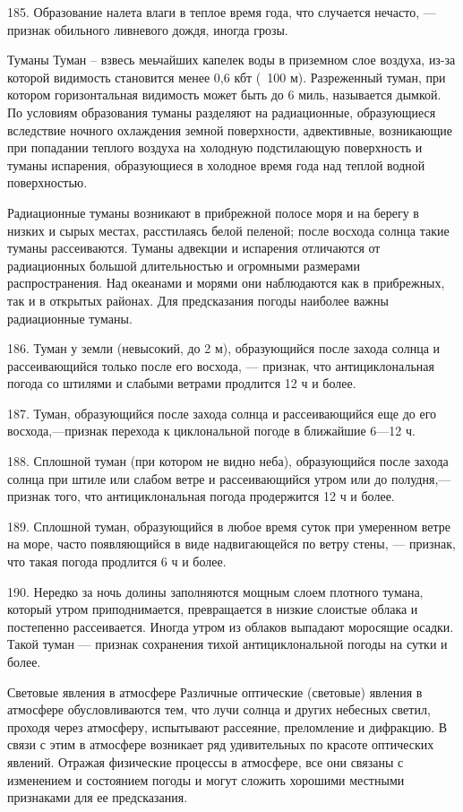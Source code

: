 185. Образование налета влаги в теплое время года, что случается нечасто, — признак обильного ливневого дождя, иногда грозы.

Туманы
Туман -- взвесь меьчайших капелек воды в приземном слое воздуха, из-за которой видимость становится менее 0,6 кбт (~100 м). Разреженный туман, при котором горизонтальная видимость может быть до 6 миль, называется дымкой. По условиям образования туманы разделяют на радиационные, образующиеся вследствие ночного охлаждения земной поверхности, адвективные, возникающие при попадании теплого воздуха на холодную подстилающую поверхность и туманы испарения, образующиеся в холодное время года над теплой водной поверхностью.

Радиационные туманы возникают в прибрежной полосе моря и на берегу в низких и сырых местах, расстилаясь белой пеленой; после восхода солнца такие туманы рассеиваются. Туманы адвекции и испарения отличаются от радиационных большой длительностью и огромными размерами распространения. Над океанами и морями они наблюдаются как в прибрежных, так и в открытых районах. Для предсказания погоды наиболее важны радиационные туманы.

186. Туман у земли (невысокий, до 2 м), образующийся после захода солнца и рассеивающийся только после его восхода, — признак, что антициклональная погода со штилями и слабыми ветрами продлится 12 ч и более.

187. Туман, образующийся после захода солнца и рассеивающийся еще до его восхода,—признак перехода к циклональной погоде в ближайшие 6—12 ч.

188. Сплошной туман (при котором не видно неба), образующийся после захода солнца при штиле или слабом ветре и рассеивающийся утром или до полудня,— признак того, что антициклональная погода продержится 12 ч и более.

189. Сплошной туман, образующийся в любое время суток при умеренном ветре на море, часто появляющийся в виде надвигающейся по ветру стены, — признак, что такая погода продлится 6 ч и более.

190. Нередко за ночь долины заполняются мощным слоем плотного тумана, который утром приподнимается, превращается в низкие слоистые облака и постепенно рассеивается. Иногда утром из облаков выпадают моросящие осадки. Такой туман — признак сохранения тихой антициклональной погоды на сутки и более.

Световые явления в атмосфере
Различные оптические (световые) явления в атмосфере обусловливаются тем, что лучи солнца и других небесных светил, проходя через атмосферу, испытывают рассеяние, преломление и дифракцию. В связи с этим в атмосфере возникает ряд удивительных по красоте оптических явлений. Отражая физические процессы в атмосфере, все они связаны с изменением и состоянием погоды и могут сложить хорошими местными признаками для ее предсказания.

